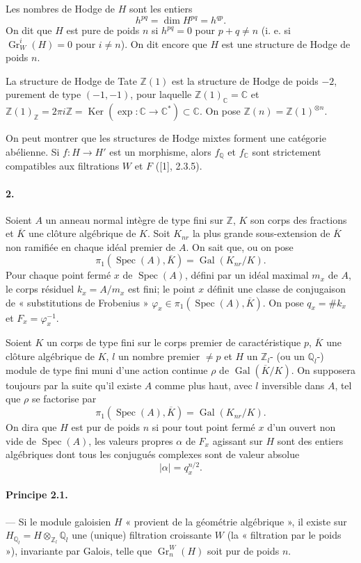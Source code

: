 \documentclass[10pt]{article}
\newcommand{\C}{\mathbb C}
\newcommand{\Q}{\mathbb Q}
\newcommand{\Z}{\mathbb Z}
\newcommand{\Gr}{\operatorname{Gr}}
\newcommand{\Gal}{\operatorname{Gal}}
\newcommand{\Spec}{\operatorname{Spec}}
\newcommand{\Ker}{\operatorname{Ker}}
\newcommand{\barK}{\overline{K}}
\begin{document}
Les nombres de Hodge de $H$ sont les entiers
\[
\tag{1.2}
h^{pq}=\dim H^{pq}=h^{qp}.
\]
On dit que $H$ est pure de poids $n$ si $h^{pq}=0$ pour $p+q\ne n$ (i. e. si $\Gr_W^i(H)=0$ pour $i\ne n$). On dit encore que $H$ est une structure de Hodge de poids $n$.

La structure de Hodge de Tate $\Z(1)$ est la structure de Hodge de poids $-2$, purement de type $(-1,-1)$, pour laquelle $\Z(1)_\C=\C$ et $\Z(1)_\Z=2\pi i\Z=\Ker(\exp:\C\to\C^*)\subset\C$. On pose $\Z(n)=\Z(1)^{\otimes n}$.

On peut montrer que les structures de Hodge mixtes forment une catégorie abélienne. Si $f:H\to H'$ est un morphisme, alors $f_\Q$ et $f_\C$ sont strictement compatibles aux filtrations $W$ et $F$ ([1], 2.3.5).

\paragraph{2.} Soient $A$ un anneau normal intègre de type fini sur $\Z$, $K$ son corps des fractions et $\barK$ une clôture algébrique de $K$. Soit $K_{nr}$ la plus grande sous-extension de $\barK$ non ramifiée en chaque idéal premier de $A$. On sait que, ou on pose
\[
\pi_1(\Spec(A),\barK)=\Gal(K_{nr}/K).
\]
Pour chaque point fermé $x$ de $\Spec(A)$, défini par un idéal maximal $m_x$ de $A$, le corps résiduel $k_x=A/m_x$ est fini; le point $x$ définit une classe de conjugaison de « substitutions de Frobenius » $\varphi_x\in\pi_1(\Spec(A),\barK)$. On pose $q_x=\#k_x$ et $F_x=\varphi_x^{-1}$.

Soient $K$ un corps de type fini sur le corps premier de caractéristique $p$, $\barK$ une clôture algébrique de $K$, $l$ un nombre premier $\ne p$ et $H$ un $\Z_l$- (ou un $\Q_l$-) module de type fini muni d'une action continue $\rho$ de $\Gal(\barK/K)$. On supposera toujours par la suite qu'il existe $A$ comme plus haut, avec $l$ inversible dans $A$, tel que $\rho$ se factorise par
\[
\pi_1(\Spec(A),\barK)=\Gal(K_{nr}/K).
\]
On dira que $H$ est pur de poids $n$ si pour tout point fermé $x$ d'un ouvert non vide de $\Spec(A)$, les valeurs propres $\alpha$ de $F_x$ agissant sur $H$ sont des entiers algébriques dont tous les conjugués complexes sont de valeur absolue
\[
|\alpha|=q_x^{n/2}.
\]

\paragraph{Principe 2.1.} — Si le module galoisien $H$ « provient de la géométrie algébrique », il existe sur $H_{\Q_l}=H\otimes_{\Z_l}\Q_l$ une (unique) filtration croissante $W$ (la « filtration par le poids »), invariante par Galois, telle que $\Gr_n^W(H)$ soit pur de poids $n$.
\end{document}
